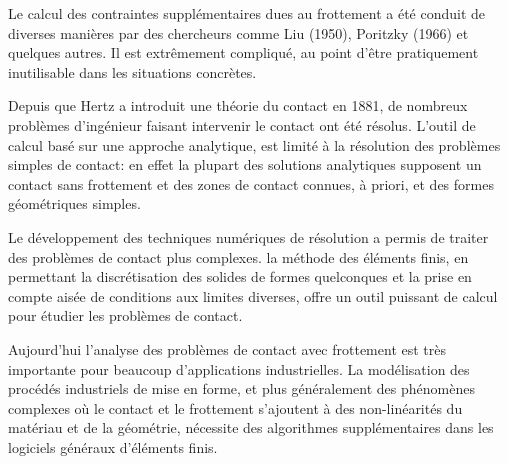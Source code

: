 \begin{histoire}
\medskip
{}

\medskip
Le calcul des contraintes supplémentaires dues au frottement a été conduit de diverses manières
par des chercheurs comme Liu (1950),
Poritzky (1966) et quelques autres.
Il est extrêmement compliqué, au point d'être pratiquement inutilisable dans les situations
concrètes.
\end{histoire}

\medskip
Depuis que Hertz a introduit une théorie
du contact en 1881, de nombreux problèmes d'ingénieur faisant intervenir le contact ont été résolus.
L'outil de calcul basé sur une approche analytique, est limité à la résolution des problèmes
simples de contact: en effet la plupart des solutions analytiques supposent un contact sans frottement
et des zones de contact connues, à priori, et des formes géométriques simples.

Le développement des techniques numériques de résolution a permis de traiter des
problèmes de contact plus complexes.
la méthode des éléments finis, en permettant la discrétisation des solides de formes quelconques et la prise en
compte aisée de conditions aux limites diverses, offre un outil puissant de calcul pour
étudier les problèmes de contact.

\medskip
Aujourd'hui l'analyse des problèmes de contact avec frottement est très importante
pour beaucoup d'applications industrielles.
La modélisation des procédés industriels de mise en forme, et plus généralement des
phénomènes complexes où le contact et le frottement s'ajoutent à des non-linéarités
du matériau et de la géométrie, nécessite des algorithmes supplémentaires dans les
logiciels généraux d'éléments finis.

